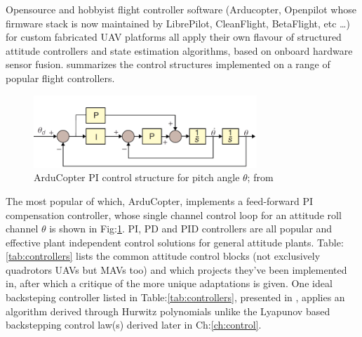 Opensource and hobbyist flight controller software (Arducopter\cite{arducoptersite}, Openpilot\cite{openpilotsite} whose firmware stack is now maintained by LibrePilot, CleanFlight\cite{cleanflight}, BetaFlight\cite{betaflight}, etc \ldots) for custom fabricated UAV platforms all apply their own flavour of structured attitude controllers and state estimation algorithms, based on onboard hardware sensor fusion. \cite{buildyourownquad} summarizes the control structures implemented on a range of popular flight controllers. 
\par
\begin{figure}[hbtp]
\centering
\includegraphics[width=0.75\textwidth]{figs/arducopter-pi}
\caption{ArduCopter PI control structure for pitch angle $\theta$; from~\cite{buildyourownquad}}
\label{fig:arducopter-pi}
\vspace{-10pt}
\end{figure}
The most popular of which, ArduCopter, implements a feed-forward PI compensation controller, whose single channel control loop for an attitude roll channel $\theta$ is shown in Fig:\ref{fig:arducopter-pi}.  PI, PD and PID controllers are all popular and effective plant independent control solutions for general attitude plants. Table:\ref{tab:controllers} lists the common attitude control blocks (not exclusively quadrotors UAVs but MAVs too) and which projects they've been implemented in, after which a critique of the more unique adaptations is given. One ideal backsteping controller listed in Table:\ref{tab:controllers}, presented in \cite{tpheonix}, applies an algorithm derived through Hurwitz polynomials unlike the Lyapunov based backstepping control law(s) derived later in Ch:\ref{ch:control}.
